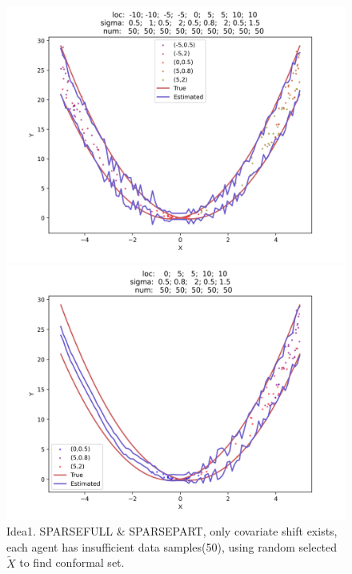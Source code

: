 \documentclass[12pt, a4paper, oneside]{article}
\begin{document}
    \begin{figure}[htbp]
        \centering
        \begin{minipage}{0.495\linewidth}
            \centering
            \includegraphics[width=0.98\linewidth]{fig/Ex1_1/SPARSEFULL.png}
        \end{minipage}
        \begin{minipage}{0.495\linewidth}
            \centering
            \includegraphics[width=0.98\linewidth]{fig/Ex1_1/SPARSEPART.png}
        \end{minipage}
        \caption{Idea1. SPARSEFULL \& SPARSEPART, only covariate shift exists, each agent has insufficient data samples(50), using random selected $\tilde{X}$ to find conformal set.}
        \label{Fig2}
    \end{figure}
\end{document}
